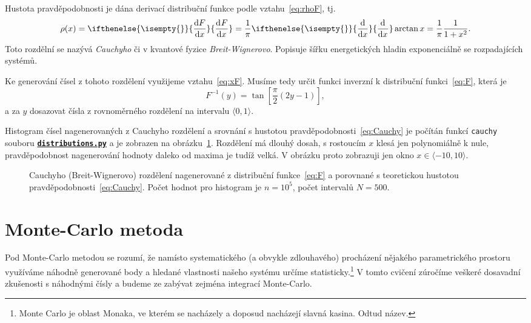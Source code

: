 \documentclass[a4paper,11pt,twoside]{article}
\renewcommand{\d}{\mathrm{d}}
\newcommand{\derivative}[3][]{\ifthenelse{\isempty{#1}}	    %
	{\frac{\d{#2}}{\d{#3}}}
	{\frac{\d^{#1}{#2}}{\d{#3}^{#1}}}
}
\def\code#1{\textnormal{\texttt{#1}}}
\def\ghfile#1#2{\textnormal{\textbf{\texttt{\href{https://github.com/PavelStransky/PCInPhysics2021/blob/main/#1#2}{#2}}}}}
\theoremstyle{red}
\theoremstyle{green}
\begin{document}
    \begin{solution}
        Hustota pravděpodobnosti je dána derivací distribuční funkce podle vztahu~\eqref{eq:rhoF}, tj.
        \begin{equation}
            \label{eq:Cauchy}
            \rho(x)=\derivative{F}{x}=\frac{1}{\pi}\derivative{}{x}\arctan{x}=\frac{1}{\pi}\frac{1}{1+x^{2}}.
        \end{equation}
        Toto rozdělní se nazývá \emph{Cauchyho} či v kvantové fyzice \emph{Breit-Wignerovo}. 
        Popisuje šířku energetických hladin exponenciálně se rozpadajících systémů.

        Ke generování čísel z tohoto rozdělení využijeme vztahu~\eqref{eq:xF}.
        Musíme tedy určit funkci inverzní k distribuční funkci~\eqref{eq:F}, která je
        \begin{equation}
            F^{-1}(y)=\tan\left[\frac{\pi}{2}\left(2y-1\right)\right],
        \end{equation}
        a za $y$ dosazovat čísla z rovnoměrného rozdělení na intervalu $\langle0,1\rangle$.

        Histogram čísel nagenerovaných z Cauchyho rozdělení a srovnání s hustotou pravděpodobnosti~\eqref{eq:Cauchy} je počítán funkcí \code{cauchy} souboru \ghfile{python/histogram/}{distributions.py} a je zobrazen na obrázku~\ref{fig:F}.
        Rozdělení má dlouhý dosah, s rostoucím $x$ klesá jen polynomiálně k nule, pravděpodobnost nagenerování hodnoty daleko od maxima je tudíž velká. 
        V obrázku proto zobrazuji jen okno $x\in\langle-10,10\rangle$.

        \begin{figure}[!htb]
            \centering{}
            \caption{
                \protect\small
                Cauchyho (Breit-Wignerovo) rozdělení nagenerované z distribuční funkce~\eqref{eq:F} a porovnané s teoretickou hustotou pravděpodobnosti~\eqref{eq:Cauchy}.
                Počet hodnot pro histogram je $n=10^5$, počet intervalů $N=500$.
            }
            \label{fig:F}
        \end{figure}    
    \end{solution}

\section{Monte-Carlo metoda}
    Pod Monte-Carlo metodou se rozumí, že namísto systematického (a obvykle zdlouhavého) procházení nějakého parametrického prostoru využíváme náhodně generované body a hledané vlastnosti našeho systému určíme statisticky.\footnote{
        Monte Carlo je oblast Monaka, ve kterém se nacházely a doposud nacházejí slavná kasina.
        Odtud název.
    }
    V tomto cvičení zúročíme veškeré dosavadní zkušenosti s náhodnými čísly a budeme ze zabývat zejména integrací Monte-Carlo.
\end{document}

